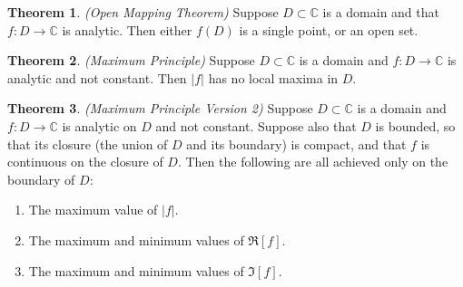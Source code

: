 \documentclass[a4paper]{article}
\theoremstyle{definition}
\newtheorem{theorem}{Theorem}
\begin{document}
	\begin{theorem}
		\emph{(Open Mapping Theorem)}
		Suppose $D \subset \mathbb{C}$ is a domain and that $f: D \rightarrow \mathbb{C}$ is analytic. Then either $f(D)$ is a single point, or an open set.
	\end{theorem}
	
	\begin{theorem}
		\emph{(Maximum Principle)}
		Suppose $D \subset \mathbb{C}$ is a domain and $f : D \rightarrow \mathbb{C}$ is analytic and not constant. Then $|f|$ has no local maxima in $D$.
	\end{theorem}
	
	\begin{theorem}
		\emph{(Maximum Principle Version 2)}
		Suppose $D \subset \mathbb{C}$ is a domain and $f : D \rightarrow \mathbb{C}$ is analytic on $D$ and not constant. Suppose also that $D$ is bounded, so that its closure (the union of $D$ and its boundary) is compact, and that $f$ is continuous on the closure of $D$. Then the following are all achieved only on the boundary of $D$:
		\begin{enumerate}[label=\alph*.]
			\item The maximum value of $|f|$.
			\item The maximum and minimum values of $\Re{[f]}$.
			\item The maximum and minimum values of $\Im{[f]}$.
		\end{enumerate}
	\end{theorem}
	
	
\end{document}
